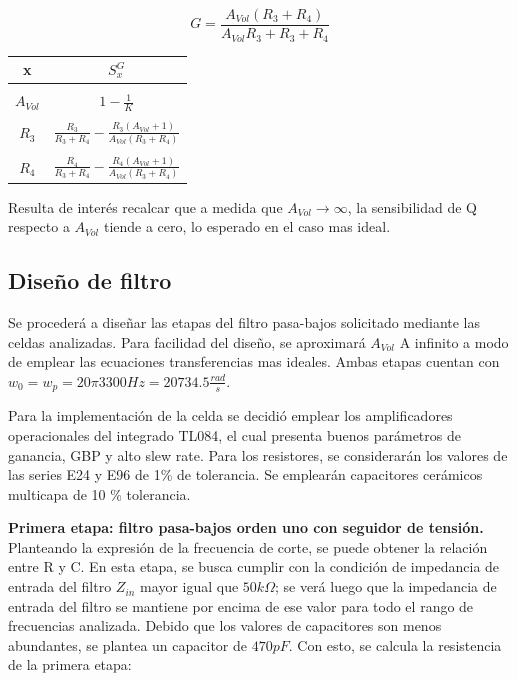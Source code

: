 $$G = \frac{A_{Vol}(R_{3} + R_{4})}{A_{Vol}R_{3} + R_{3} + R_{4}}$$

\begin{table}[H]
\centering
\begin{tabular}{c|c}
x         & $S^{G}_{x}$                                                                 \\ \hline
\\
$A_{Vol}$ & $1 - \frac{1}{K}$                                                           \\
\\
$R_{3}$   & $\frac{R_{3}}{R_{3}+R_{4}} - \frac{R_{3}(A_{Vol}+1)}{A_{Vol}(R_{3}+R_{4})}$ \\
\\
$R_{4}$   & $\frac{R_{4}}{R_{3}+R_{4}} - \frac{R_{4}(A_{Vol}+1)}{A_{Vol}(R_{3}+R_{4})}$
\\
\end{tabular}
\label{table:SG}
\end{table}

Resulta de interés recalcar que a medida que $A_{Vol} \rightarrow \infty$, la sensibilidad de Q respecto a $A_{Vol}$ tiende a cero, lo esperado en el caso mas ideal. 

\subsection{Diseño de filtro}


Se procederá a diseñar las etapas del filtro pasa-bajos solicitado mediante las celdas analizadas. Para facilidad del diseño, se aproximará $A_{Vol}$ A infinito a modo de emplear las ecuaciones transferencias mas ideales. Ambas etapas cuentan con $w_{0} = w_{p} = 20 \pi 3300 Hz = 20734.5 \frac{rad}{s}$. 

Para la implementación de la celda se decidió emplear los amplificadores operacionales del integrado TL084, el cual presenta buenos parámetros de ganancia, GBP y alto slew rate. Para los resistores, se considerarán los valores de las series E24 y E96 de 1\% de tolerancia. Se emplearán capacitores cerámicos multicapa de 10 \% tolerancia. 


\textbf{Primera etapa: filtro pasa-bajos orden uno con seguidor de tensión.} Planteando la expresión de la frecuencia de corte, se puede obtener la relación entre R y C. En esta etapa, se busca cumplir con la condición de impedancia de entrada del filtro $Z_{in}$ mayor igual que $50k \Omega$; se verá luego que la impedancia de entrada del filtro se mantiene por encima de ese valor para todo el rango de frecuencias analizada. Debido que los valores de capacitores son menos abundantes, se plantea un capacitor de $470 pF$. Con esto, se calcula la resistencia de la primera etapa:

